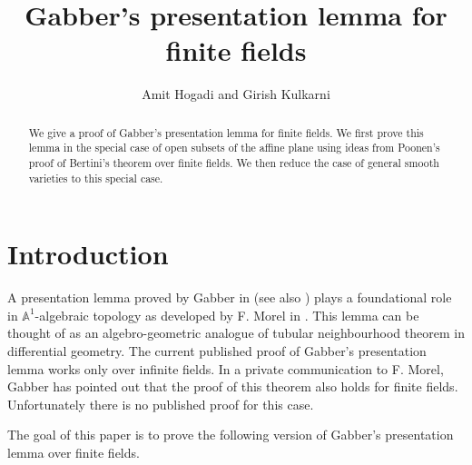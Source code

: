 \documentclass[10pt]{amsart}
\theoremstyle{plain}
\theoremstyle{definition}
\newcommand{\A}{{\mathbb A}}
\begin{document}
\title{G\MakeLowercase{abber's presentation lemma for finite fields}}
\author{{A\MakeLowercase{mit} H\MakeLowercase{ogadi}} \MakeLowercase{and}
{G\MakeLowercase{irish} K\MakeLowercase{ulkarni}}}



\date{}

\begin{abstract}
We give a proof of Gabber's presentation lemma for finite fields. We first prove this lemma in the special case of open subsets of the affine plane using ideas from Poonen's proof of Bertini's theorem over finite fields. We then reduce the case of general smooth varieties to this special case. 
\end{abstract}

\maketitle

\section{Introduction}

A presentation lemma proved by Gabber in \cite{gabber} (see also \cite{chk}) plays a foundational role in $\A^1$-algebraic topology as developed by F. Morel in  \cite{Morel}. This lemma can be thought of as an algebro-geometric analogue of tubular neighbourhood theorem in differential geometry.  The current published proof of Gabber's presentation lemma works only over infinite fields. In a private communication to F. Morel, Gabber has pointed out that the proof of this theorem also holds for finite fields. Unfortunately there is no published proof for this case.

The goal of this paper is to prove the following version of Gabber's presentation lemma over finite fields. 
\end{document}
